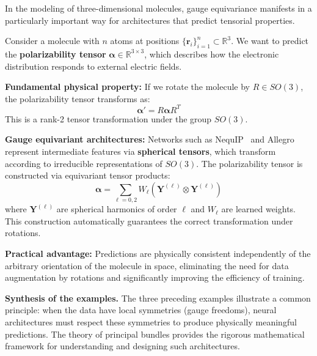 \begin{example}\label{ex:gauge_moleculas}
In the modeling of three-dimensional molecules, gauge equivariance manifests in a particularly important way for architectures that predict tensorial properties.

Consider a molecule with $n$ atoms at positions $\{\mathbf{r}_i\}_{i=1}^n \subset \mathbb{R}^3$. We want to predict the \textbf{polarizability tensor} $\boldsymbol{\alpha} \in \mathbb{R}^{3 \times 3}$, which describes how the electronic distribution responds to external electric fields.

\textbf{Fundamental physical property:} If we rotate the molecule by $R \in SO(3)$, the polarizability tensor transforms as:
\begin{equation}
\boldsymbol{\alpha}' = R \boldsymbol{\alpha} R^T
\end{equation}
This is a rank-2 tensor transformation under the group $SO(3)$.

\textbf{Gauge equivariant architectures:} Networks such as NequIP~\citep{batzner2022nequip} and Allegro represent intermediate features via \textbf{spherical tensors}, which transform according to irreducible representations of $SO(3)$. The polarizability tensor is constructed via equivariant tensor products:
\begin{equation}
\boldsymbol{\alpha} = \sum_{\ell=0,2} W_\ell \left( \mathbf{Y}^{(\ell)} \otimes \mathbf{Y}^{(\ell)} \right)
\end{equation}
where $\mathbf{Y}^{(\ell)}$ are spherical harmonics of order $\ell$ and $W_\ell$ are learned weights. This construction automatically guarantees the correct transformation under rotations.

\textbf{Practical advantage:} Predictions are physically consistent independently of the arbitrary orientation of the molecule in space, eliminating the need for data augmentation by rotations and significantly improving the efficiency of training.
\end{example}

\textbf{Synthesis of the examples.} The three preceding examples illustrate a common principle: when the data have local symmetries (gauge freedoms), neural architectures must respect these symmetries to produce physically meaningful predictions. The theory of principal bundles provides the rigorous mathematical framework for understanding and designing such architectures.

